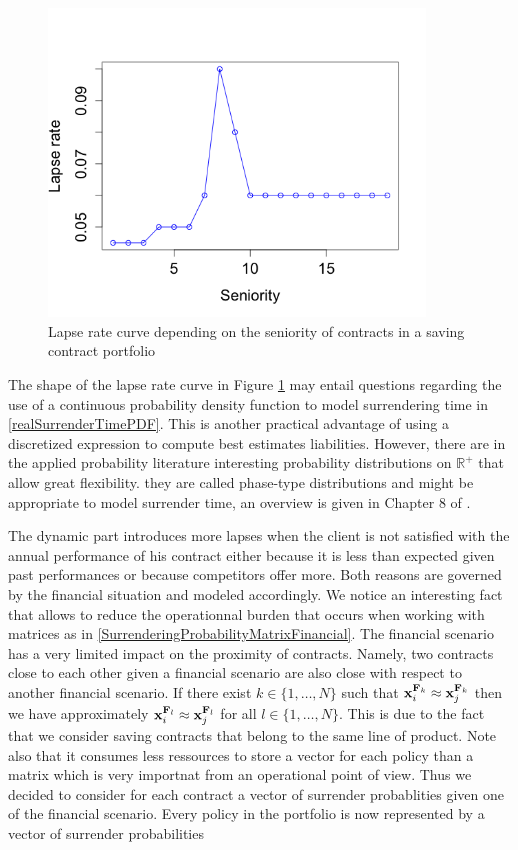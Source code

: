 \begin{center}
	\begin{figure}[ht!]
		\begin{center}
			\includegraphics[width=10cm]{Chapitre6/LapseRate.png}
			\caption{Lapse rate curve depending on the seniority of contracts in a saving contract portfolio}
			\label{LapseRate}
		\end{center}
	\end{figure}
\end{center}
\begin{Rk}\label{ContinuousLapseModelization}
The shape of the lapse rate curve in Figure \ref{LapseRate} may entail questions regarding the use of a continuous probability density function to model surrendering time in \eqref{realSurrenderTimePDF}. This is another practical advantage of using a discretized expression to compute best estimates liabilities. However, there are in the applied probability literature interesting probability distributions on $\mathbb{R}^{+}$ that allow great flexibility. they are called phase-type distributions and might be appropriate to model surrender time, an overview is given in Chapter 8 of \citet{AsAl10}.
\end{Rk}
The dynamic part introduces more lapses when the client is not satisfied with the annual performance of his contract either because it is less than expected given past performances or because competitors offer more. Both reasons are governed by the financial situation and modeled accordingly. We notice an interesting fact that allows to reduce the operationnal burden that occurs when working with matrices as in \eqref{SurrenderingProbabilityMatrixFinancial}. The financial scenario has a very limited impact on the proximity of contracts. Namely, two contracts close to each other given a financial scenario are also close with respect to another financial scenario. If there exist $k\in\{1,\ldots,N\}$ such that $\bold{x}_{i}^{\bold{F}_{k}}\approx\bold{x}_{j}^{\bold{F}_{k}}$ then we have approximately $\bold{x}_{i}^{\bold{F}_{l}}\approx\bold{x}_{j}^{\bold{F}_{l}}$ for all $l\in\{1,\ldots,N\}$. This is due to the fact that we consider saving contracts that belong to the same line of product. Note also that it consumes less ressources to store a vector for each policy than a matrix which is very importnat from an operational point of view. Thus we decided to consider for each contract a vector of surrender probablities given one of the financial scenario. Every policy in the portfolio is now represented by a vector of surrender probabilities
